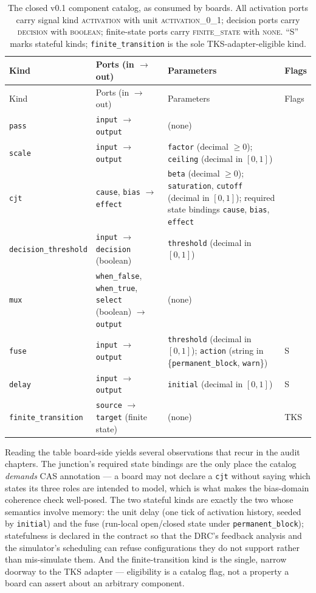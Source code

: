 \begin{longtable}{@{}lp{4.2cm}p{5.3cm}l@{}}
\caption{The closed v0.1 component catalog, as consumed by boards. All
activation ports carry signal kind \textsc{activation} with unit
\textsc{activation\_0\_1}; decision ports carry \textsc{decision} with
\textsc{boolean}; finite-state ports carry \textsc{finite\_state} with
\textsc{none}. ``S'' marks stateful kinds; \texttt{finite\_transition}
is the sole TKS-adapter-eligible kind.}
\label{ch05:tab:catalog}\\
\toprule
Kind & Ports (in $\to$ out) & Parameters & Flags \\
\midrule
\endfirsthead
\toprule
Kind & Ports (in $\to$ out) & Parameters & Flags \\
\midrule
\endhead
\bottomrule
\endfoot
\texttt{pass} & \texttt{input} $\to$ \texttt{output} & (none) & \\
\texttt{scale} & \texttt{input} $\to$ \texttt{output} &
\texttt{factor} (decimal $\ge 0$); \texttt{ceiling} (decimal in
$[0,1]$) & \\
\texttt{cjt} & \texttt{cause}, \texttt{bias} $\to$ \texttt{effect} &
\texttt{beta} (decimal $\ge 0$); \texttt{saturation}, \texttt{cutoff}
(decimal in $[0,1]$); required state bindings \texttt{cause},
\texttt{bias}, \texttt{effect} & \\
\texttt{decision\_threshold} & \texttt{input} $\to$ \texttt{decision}
(boolean) & \texttt{threshold} (decimal in $[0,1]$) & \\
\texttt{mux} & \texttt{when\_false}, \texttt{when\_true},
\texttt{select} (boolean) $\to$ \texttt{output} & (none) & \\
\texttt{fuse} & \texttt{input} $\to$ \texttt{output} &
\texttt{threshold} (decimal in $[0,1]$); \texttt{action} (string in
\{\texttt{permanent\_block}, \texttt{warn}\}) & S \\
\texttt{delay} & \texttt{input} $\to$ \texttt{output} &
\texttt{initial} (decimal in $[0,1]$) & S \\
\texttt{finite\_transition} & \texttt{source} $\to$ \texttt{target}
(finite state) & (none) & TKS \\
\end{longtable}

Reading the table board-side yields several observations that recur in
the audit chapters. The junction's required state bindings are the only
place the catalog \emph{demands} CAS annotation --- a board may not
declare a \texttt{cjt} without saying which states its three roles are
intended to model, which is what makes the bias-domain coherence check
well-posed. The two stateful kinds are exactly the two whose semantics
involve memory: the unit delay (one tick of activation history, seeded
by \texttt{initial}) and the fuse (run-local open/closed state under
\texttt{permanent\_block}); statefulness is declared in the contract so
that the DRC's feedback analysis and the simulator's scheduling can
refuse configurations they do not support rather than mis-simulate
them. And the finite-transition kind is the single, narrow doorway to
the TKS adapter --- eligibility is a catalog flag, not a property a
board can assert about an arbitrary component.

